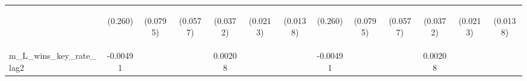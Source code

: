 \documentclass[]{article}
\begin{document}
\begin{center}
\begin{tabular}{lcccccccccccc}
\vspace{4pt} & \begin{footnotesize}(0.260)\end{footnotesize} & \begin{footnotesize}(0.0795)\end{footnotesize} & \begin{footnotesize}(0.0577)\end{footnotesize} & \begin{footnotesize}(0.0372)\end{footnotesize} & \begin{footnotesize}(0.0213)\end{footnotesize} & \begin{footnotesize}(0.0138)\end{footnotesize} & \begin{footnotesize}(0.260)\end{footnotesize} & \begin{footnotesize}(0.0795)\end{footnotesize} & \begin{footnotesize}(0.0577)\end{footnotesize} & \begin{footnotesize}(0.0372)\end{footnotesize} & \begin{footnotesize}(0.0213)\end{footnotesize} & \begin{footnotesize}(0.0138)\end{footnotesize} \\
m\_L\_wins\_key\_rate\_lag2 & -0.00491 &  &  & 0.00208 &  &  & -0.00491 &  &  & 0.00208 &  &  \\

\end{tabular}
\end{center}
\end{document}
